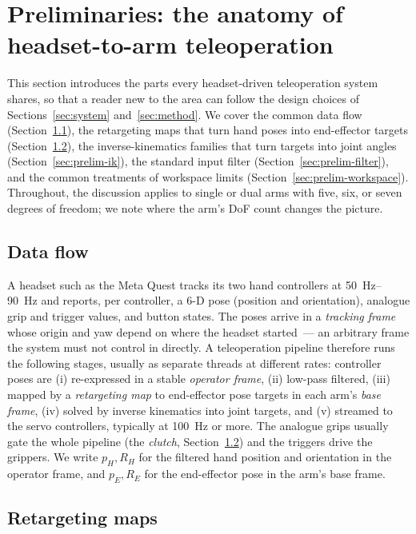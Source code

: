\section{Preliminaries: the anatomy of headset-to-arm teleoperation}
\label{sec:prelim}

This section introduces the parts every headset-driven teleoperation
system shares, so that a reader new to the area can follow the design
choices of Sections~\ref{sec:system} and~\ref{sec:method}. We cover the
common data flow (Section~\ref{sec:prelim-dataflow}), the retargeting
maps that turn hand poses into end-effector targets
(Section~\ref{sec:prelim-retarget}), the inverse-kinematics families
that turn targets into joint angles (Section~\ref{sec:prelim-ik}), the
standard input filter (Section~\ref{sec:prelim-filter}), and the common
treatments of workspace limits (Section~\ref{sec:prelim-workspace}).
Throughout, the discussion applies to single or dual arms with five,
six, or seven degrees of freedom; we note where the arm's DoF count
changes the picture.

\subsection{Data flow}
\label{sec:prelim-dataflow}

A headset such as the Meta Quest tracks its two hand controllers at
\SIrange{50}{90}{Hz} and reports, per controller, a 6-D pose (position
and orientation), analogue grip and trigger values, and button states.
The poses arrive in a \emph{tracking frame} whose origin and yaw depend
on where the headset started~--- an arbitrary frame the system must not
control in directly. A teleoperation pipeline therefore runs the
following stages, usually as separate threads at different rates:
controller poses are (i) re-expressed in a stable \emph{operator frame},
(ii) low-pass filtered, (iii) mapped by a \emph{retargeting map} to
end-effector pose targets in each arm's \emph{base frame}, (iv) solved
by inverse kinematics into joint targets, and (v) streamed to the servo
controllers, typically at \SI{100}{Hz} or more. The analogue grips
usually gate the whole pipeline (the \emph{clutch},
Section~\ref{sec:prelim-retarget}) and the triggers drive the grippers.
We write \(p_H, R_H\) for the filtered hand position and orientation in
the operator frame, and \(p_E, R_E\) for the end-effector pose in the
arm's base frame.

\subsection{Retargeting maps}
\label{sec:prelim-retarget}

